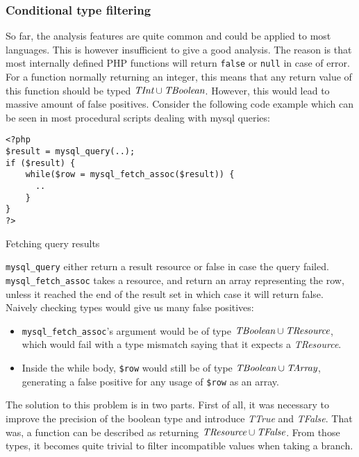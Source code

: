 \documentclass[a4paper]{article}
\begin{document}
\subsubsection{Conditional type filtering}
\label{cond-type-filtr}
So far, the analysis features are quite common and could be applied to most
languages. This is however insufficient to give a good analysis. The reason is
that most internally defined PHP functions will return \verb/false/ or
\verb/null/ in case of error. For a function normally returning an integer,
this means that any return value of this function should be typed
$\emph{TInt} \cup \emph{TBoolean}$. However, this would lead to massive amount of false
positives. Consider the following code example which can be seen in most
procedural scripts dealing with mysql queries:

\begin{listing}
  \begin{verbatim}
<?php
$result = mysql_query(..);
if ($result) {
    while($row = mysql_fetch_assoc($result)) {
      ..
    }
}
?>
  \end{verbatim}
  \caption{Fetching query results}
\end{listing}

\verb/mysql_query/ either return a result resource or false in case the query
failed. \verb/mysql_fetch_assoc/ takes a resource, and return an array
representing the row, unless it reached the end of the result set in which case
it will return false. Naively checking types would give us many false
positives:
\begin{itemize}
  \item \verb/mysql_fetch_assoc/'s argument would be of type
    $\emph{TBoolean} \cup \emph{TResource}$, which would fail with a type
    mismatch saying that it expects a \emph{TResource}.
  \item Inside the while body, \verb/$row/ would still be of type $\emph{TBoolean}
    \cup \emph{TArray}$, generating a false positive for any usage of
    \verb/$row/ as an array.
\end{itemize}

The solution to this problem is in two parts. First of all, it was necessary to
improve the precision of the boolean type and introduce \emph{TTrue} and
\emph{TFalse}.  That was, a function can be described as returning
$\emph{TResource} \cup \emph{TFalse}$.  From those types, it becomes quite
trivial to filter incompatible values when taking a branch.
\end{document}
